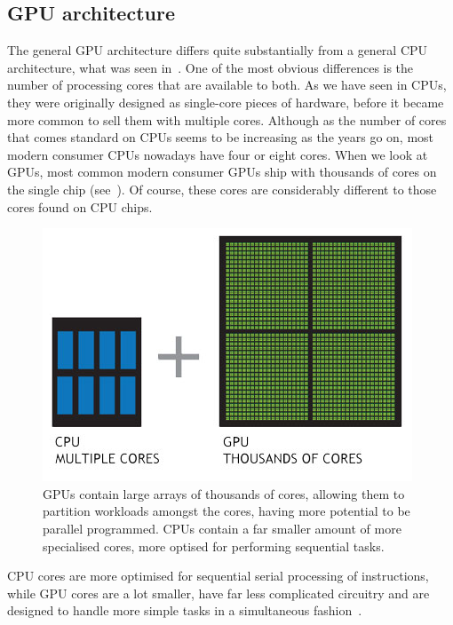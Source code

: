 \documentclass[a4paper,11pt]{article}
\begin{document}
\subsection{GPU architecture} %
\label{sub:gpu_architecture}
The general GPU architecture differs quite substantially from a general CPU architecture, what was seen
in~. One of the most obvious differences is the number of processing cores
that are available to both. As we have seen in CPUs, they were originally designed as single-core pieces of hardware,
before it became more common to sell them with multiple cores. Although as the number of cores that comes standard on
CPUs seems to be increasing as the years go on, most modern consumer CPUs nowadays have four or eight cores. When we
look at GPUs, most common modern consumer GPUs ship with thousands of cores on the single chip (see~).
Of course, these cores are considerably different to those cores found on CPU chips.

\begin{figure}[ht]
  \centering
  \includegraphics[scale=0.5]{img/cpu-and-gpu}
  \caption{GPUs contain large arrays of thousands of cores, allowing them to partition workloads amongst the cores,
  having more potential to be parallel programmed. CPUs contain a far smaller amount of more specialised cores, more
  optised for performing sequential tasks.~\cite{web:NvidiaCPUvsGPU}}
\label{fig:gpu-vs-cpu}
\end{figure}

CPU cores are more optimised for sequential serial processing of instructions, while GPU cores are a lot smaller, have
far less complicated circuitry and are designed to handle more simple tasks in a simultaneous fashion~\cite{web:NvidiaGPUComputing}.
\end{document}
